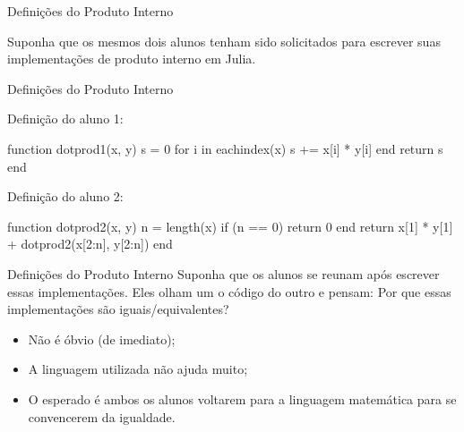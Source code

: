 \begin{frame}{Definições do Produto Interno}
  \begin{center}
    Suponha que os mesmos dois alunos tenham sido solicitados para escrever suas implementações de produto interno em Julia.
  \end{center}
\end{frame}

\begin{frame}[fragile]{Definições do Produto Interno}
  \begin{minipage}[t]{0.45\textwidth}
    Definição do aluno 1:
    \vspace{0.5cm}
    \begin{code}
function dotprod1(x, y)
    s = 0
    for i in eachindex(x)
        s += x[i] * y[i]
    end
    return s
end
    \end{code}
  \end{minipage}
  \pause
  \hfill
  \vrule
  \hfill
  \begin{minipage}[t]{0.50\textwidth}
    Definição do aluno 2:
    \vspace{0.5cm}
    \begin{code}
function dotprod2(x, y)
    n = length(x)
    if (n == 0)
        return 0
    end
    return x[1] * y[1] +
           dotprod2(x[2:n],
                    y[2:n])
end
    \end{code}
  \end{minipage}
  \vfill
\end{frame}

\begin{frame}{Definições do Produto Interno}
  Suponha que os alunos se reunam após escrever essas implementações. Eles olham um o código do outro e pensam: Por que essas implementações são iguais/equivalentes?

  \pause
  \vspace{0.5cm}

  \begin{itemize}
    \item Não é óbvio (de imediato); \pause \\[0.2cm]
    \item A linguagem utilizada não ajuda muito; \pause \\[0.2cm]
    \item O esperado é ambos os alunos voltarem para a linguagem matemática para se convencerem da igualdade.
  \end{itemize}
\end{frame}

